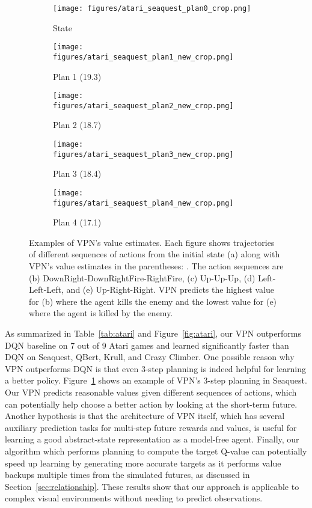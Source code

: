 \documentclass{article}
\begin{document}
\begin{figure}[!]
	\centering
	\begin{subfigure}{0.185\linewidth}
    		\centering
	    \texttt{[image: figures/atari\_seaquest\_plan0\_crop.png]}
	    \caption{State}  
   	\end{subfigure}   	
   	\hfill
   	\begin{subfigure}{0.185\linewidth}
    		\centering
	    \texttt{[image: figures/atari\_seaquest\_plan1\_new\_crop.png]} 
	    \caption{Plan 1 (19.3)}
   	\end{subfigure} 
   	\hfill
   	\begin{subfigure}{0.185\linewidth}
    		\centering
	    \texttt{[image: figures/atari\_seaquest\_plan2\_new\_crop.png]}  
	    \caption{Plan 2 (18.7)}
   	\end{subfigure}
   	\hfill
   	\begin{subfigure}{0.185\linewidth}
    		\centering
	    \texttt{[image: figures/atari\_seaquest\_plan3\_new\_crop.png]}  
	    \caption{Plan 3 (18.4)}
   	\end{subfigure} 
   	\hfill
	\begin{subfigure}{0.185\linewidth}
    		\centering
	    \texttt{[image: figures/atari\_seaquest\_plan4\_new\_crop.png]}  
	    \caption{Plan 4 (17.1)}
   	\end{subfigure}
\caption{Examples of VPN's value estimates. Each figure shows trajectories of different sequences of actions from the initial state (a) along with VPN's value estimates in the parentheses: . The action sequences are (b) DownRight-DownRightFire-RightFire, (c) Up-Up-Up, (d) Left-Left-Left, and (e) Up-Right-Right. VPN predicts the highest value for (b) where the agent kills the enemy and the lowest value for (e) where the agent is killed by the enemy. } 
	\vspace{-10pt}
	\label{fig:atari-plan}
\end{figure}


As summarized in Table~\ref{tab:atari} and Figure~\ref{fig:atari}, our VPN outperforms DQN baseline on 7 out of 9 Atari games and learned significantly faster than DQN on Seaquest, QBert, Krull, and Crazy Climber. 
One possible reason why VPN outperforms DQN is that even 3-step planning is indeed helpful for learning a better policy. Figure~\ref{fig:atari-plan} shows an example of VPN's 3-step planning in Seaquest. Our VPN predicts reasonable values given different sequences of actions, which can potentially help choose a better action by looking at the short-term future.
 Another hypothesis is that the architecture of VPN itself, which has several auxiliary prediction tasks for multi-step future rewards and values, is useful for learning a good abstract-state representation as a model-free agent. Finally, our algorithm which performs planning to compute the target Q-value can potentially speed up learning by generating more accurate targets as it performs value backups multiple times from the simulated futures, as discussed in Section~\ref{sec:relationship}. These results show that our approach is applicable to complex visual environments without needing to predict observations.
 
\end{document}
